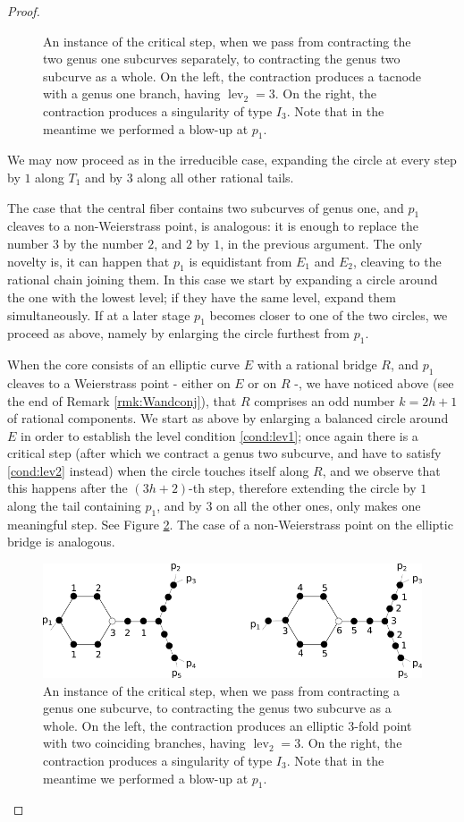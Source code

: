 \documentclass[11pt]{amsart}
\newcommand{\lev}{\operatorname{lev}}
\theoremstyle{plain}
\theoremstyle{definition}
\begin{document}
\begin{proof}
\begin{itemize}[leftmargin=.4cm]
\begin{figure}
   \caption{An instance of the critical step, when we pass from contracting the two genus one subcurves separately, to contracting the genus two subcurve as a whole. On the left, the contraction produces a tacnode with a genus one branch, having $\lev_2=3$. On the right, the contraction produces a singularity of type $I_3$. Note that in the meantime we performed a blow-up at $p_1$.}\label{fig:critical}
  \end{figure}
 We may now proceed as in the irreducible case, expanding the circle at every step by $1$ along $T_1$ and by $3$ along all other rational tails.
 \end{itemize}
 The case that the central fiber contains two subcurves of genus one, and $p_1$ cleaves to a non-Weierstrass point, is analogous: it is enough to replace the number $3$ by the number $2$, and $2$ by $1$, in the previous argument. The only novelty is, it can happen that $p_1$ is equidistant from $E_1$ and $E_2$, cleaving to the rational chain joining them. In this case we start by expanding a circle around the one with the lowest level; if they have the same level, expand them simultaneously. If at a later stage $p_1$ becomes closer to one of the two circles, we proceed as above, namely by enlarging the circle furthest from $p_1$.
 
 \smallskip
 
 When the core consists of an elliptic curve $E$ with a rational bridge $R$, and $p_1$ cleaves to a Weierstrass point - either on $E$ or on $R$ -, we have noticed above (see the end of Remark \ref{rmk:Wandconj}), that $R$ comprises an odd number $k=2h+1$ of rational components. We start as above by enlarging a balanced circle around $E$ in order to establish the level condition \eqref{cond:lev1}; once again there is a critical step (after which we contract a genus two subcurve, and have to satisfy \eqref{cond:lev2} instead) when the circle touches itself along $R$, and we observe that this happens after the $(3h+2)$-th step, therefore extending the circle by $1$ along the tail containing $p_1$, and by $3$ on all the other ones, only makes one meaningful step. See Figure \ref{fig:crit_step_ER}. The case of a non-Weierstrass point on the elliptic bridge is analogous.
 \begin{figure}
   \includegraphics[width=.8\textwidth]{critical_step_ER}
   \caption{An instance of the critical step, when we pass from contracting a genus one subcurve, to contracting the genus two subcurve as a whole. On the left, the contraction produces an elliptic $3$-fold point with two coinciding branches, having $\lev_2=3$. On the right, the contraction produces a singularity of type $I_3$. Note that in the meantime we performed a blow-up at $p_1$.}\label{fig:crit_step_ER}
  \end{figure}
  

\end{proof}
\end{document}
